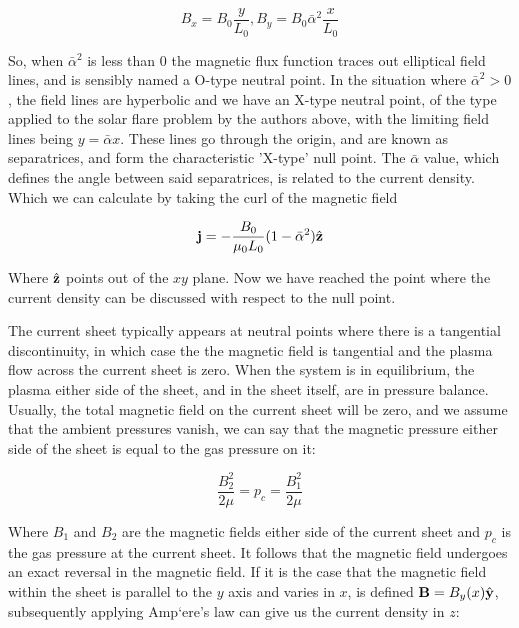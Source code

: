 \begin{equation}
	B_x = B_0\frac{y}{L_0}, B_y = B_0\bar{\alpha}^2\frac{x}{L_0}
\end{equation}

So, when $\bar{\alpha}^2$ is less than $0$ the magnetic flux function traces out elliptical field lines, and is sensibly named a O-type neutral point.
In the situation where $\bar{\alpha}^2 > 0$, the field lines are hyperbolic and we have an X-type neutral point, of the type applied to the solar flare problem by the authors above, with the limiting field lines being $y = \bar{\alpha}x$.
These lines go through the origin, and are known as separatrices, and form the characteristic 'X-type' null point. 
The $\bar{\alpha}$ value, which defines the angle between said separatrices, is related to the current density.
Which we can calculate by taking the curl of the magnetic field

\begin{equation}
	\mathbf{j} = -\frac{B_0}{\mu_0L_0}(1 - \bar{\alpha}^2)\hat{\mathbf{z}}
\end{equation}

Where $\hat{\mathbf{z}}$ points out of the $xy$ plane.
Now we have reached the point where the current density can be discussed with respect to the null point.

The current sheet typically appears at neutral points where there is a tangential discontinuity, in which case the the magnetic field is tangential and the plasma flow across the current sheet is zero.
When the system is in equilibrium, the plasma either side of the sheet, and in the sheet itself, are in pressure balance.
Usually, the total magnetic field on the current sheet will be zero, and we assume that the ambient pressures vanish, we can say that the magnetic pressure either side of the sheet is equal to the gas pressure on it:

\begin{equation}
	\frac{B_2^2}{2\mu} = p_c = \frac{B_1^2}{2\mu}
\end{equation}

Where $B_1$ and $B_2$ are the magnetic fields either side of the current sheet and $p_c$ is the gas pressure at the current sheet.
It follows that the magnetic field undergoes an exact reversal in the magnetic field.
If it is the case that the magnetic field within the sheet is parallel to the $y$ axis and varies in $x$, is defined $\mathbf{B} = B_y(x)\hat{\mathbf{y}}$, subsequently applying Amp{`e}re's law can give us the current density in $z$:

